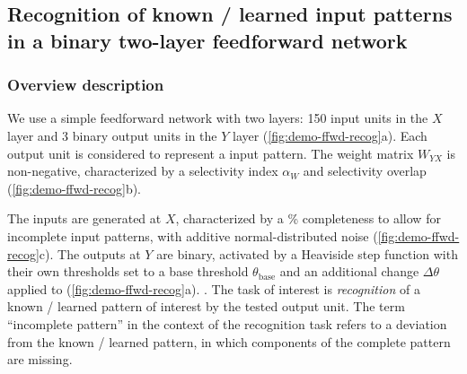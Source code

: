 \subsection{Recognition of known / learned input patterns in a binary two-layer feedforward network}

\subsubsection*{Overview description}

We use a simple feedforward network with two layers:
        150 input units in the $X$ layer
        and 3 binary output units in the $Y$ layer (\autoref{fig:demo-ffwd-recog}a).
    Each output unit is considered to represent a input pattern.
    The weight matrix $W_{YX}$ is non-negative, characterized by
        a selectivity index $\alpha_W$
        and selectivity overlap (\autoref{fig:demo-ffwd-recog}b).

The inputs are generated at $X$, characterized by
        a \% completeness to allow for incomplete input patterns,
        with additive normal-distributed noise (\autoref{fig:demo-ffwd-recog}c).
    The outputs at $Y$ are binary,
        activated by a Heaviside step function with
            their own thresholds set to a base threshold $\theta_{\mathrm{base}}$
            and an additional change $\Delta \theta$ applied to
            (\autoref{fig:demo-ffwd-recog}a).
    .
    The task of interest is \textit{recognition} of a known / learned pattern of interest by the tested output unit.
    The term ``incomplete pattern'' in the context of the recognition task refers to a deviation from the known / learned pattern,
        in which components of the complete pattern are missing.




